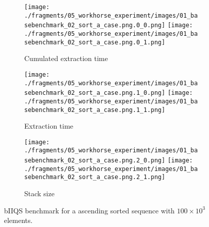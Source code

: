 \begin{figure}

    \centering
    \begin{subfigure}[b]{\textwidth}
        \centering
        \texttt{[image: ./fragments/05\_workhorse\_experiment/images/01\_basebenchmark\_02\_sort\_a\_case.png.0\_0.png]}
        \texttt{[image: ./fragments/05\_workhorse\_experiment/images/01\_basebenchmark\_02\_sort\_a\_case.png.0\_1.png]}
        \caption{Cumulated extraction time}
        \label{FIG:WORKHORSE_BENCHMARK_02__0_0}
    \end{subfigure}

    \begin{subfigure}[b]{\textwidth}
        \centering
        \texttt{[image: ./fragments/05\_workhorse\_experiment/images/01\_basebenchmark\_02\_sort\_a\_case.png.1\_0.png]}
        \texttt{[image: ./fragments/05\_workhorse\_experiment/images/01\_basebenchmark\_02\_sort\_a\_case.png.1\_1.png]}
        \caption{Extraction time}
        \label{FIG:WORKHORSE_BENCHMARK_02__0_0}
    \end{subfigure}

    \begin{subfigure}[b]{\textwidth}
        \centering
        \texttt{[image: ./fragments/05\_workhorse\_experiment/images/01\_basebenchmark\_02\_sort\_a\_case.png.2\_0.png]}
        \texttt{[image: ./fragments/05\_workhorse\_experiment/images/01\_basebenchmark\_02\_sort\_a\_case.png.2\_1.png]}
        \caption{Stack size}
        \label{FIG:WORKHORSE_BENCHMARK_02__0_0}
    \end{subfigure}
    
    \caption{bIIQS benchmark for a ascending sorted sequence with $100\times10^3$ elements.}
       \label{FIG:WORKHORSE_BENCHMARK_02}
\end{figure}



